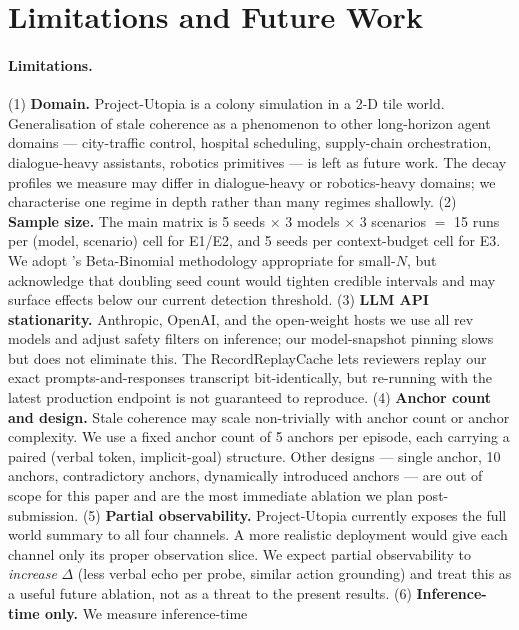 \section{Limitations and Future Work}
\label{sec:limitations}

\paragraph{Limitations.}
(1) \textbf{Domain.} Project-Utopia is a colony simulation in a
2-D tile world. Generalisation of stale coherence as a phenomenon
to other long-horizon agent domains --- city-traffic control,
hospital scheduling, supply-chain orchestration, dialogue-heavy
assistants, robotics primitives --- is left as future work. The
decay profiles we measure may differ in dialogue-heavy or
robotics-heavy domains; we characterise one regime in depth rather
than many regimes shallowly.
(2) \textbf{Sample size.} The main matrix is 5 seeds $\times$ 3
models $\times$ 3 scenarios $=$ 15 runs per
(model, scenario) cell for E1/E2, and 5 seeds per
context-budget cell for E3. We adopt
\citet{Bowyer2025DontUseClt}'s Beta-Binomial methodology
appropriate for small-$N$, but acknowledge that doubling seed
count would tighten credible intervals and may surface effects
below our current detection threshold.
(3) \textbf{LLM API stationarity.} Anthropic, OpenAI, and the
open-weight hosts we use all rev models and adjust safety filters
on inference; our model-snapshot pinning slows but does not
eliminate this. The RecordReplayCache lets reviewers replay our
exact prompts-and-responses transcript bit-identically, but
re-running with the latest production endpoint is not guaranteed
to reproduce.
(4) \textbf{Anchor count and design.} Stale coherence may scale
non-trivially with anchor count or anchor complexity. We use a
fixed anchor count of 5 anchors per episode, each carrying a
paired (verbal token, implicit-goal) structure. Other designs ---
single anchor, 10 anchors, contradictory anchors, dynamically
introduced anchors --- are out of scope for this paper and are
the most immediate ablation we plan post-submission.
(5) \textbf{Partial observability.} Project-Utopia currently
exposes the full world summary to all four channels. A more
realistic deployment would give each channel only its proper
observation slice. We expect partial observability to
\emph{increase} $\Delta$ (less verbal echo per probe, similar
action grounding) and treat this as a useful future ablation,
not as a threat to the present results.
(6) \textbf{Inference-time only.} We measure inference-time
